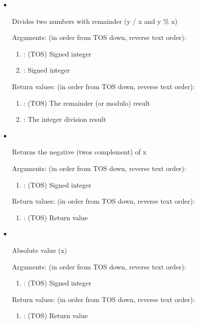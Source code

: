 \begin{itemize}
\noindent Return values: (in order from TOS down, reverse text order):
\begin{enumerate}
\item {}: (TOS) Lower 32 bits of the return product
\item {}: Upper 32 bits of the return product
\end{enumerate}

\item \forthinlinehl{/{\%}}\ 

\noindent Divides two numbers with remainder (y / x and y {\%} x)

\noindent Arguments: (in order from TOS down, reverse text order):
\begin{enumerate}
\item {}: (TOS) Signed integer
\item {}: Signed integer
\end{enumerate}

\noindent Return values: (in order from TOS down, reverse text order):
\begin{enumerate}
\item {}: (TOS) The remainder (or modulo) result
\item {}: The integer division result
\end{enumerate}

\item {}\ 

\noindent Returns the negative (twos complement) of x

\noindent Arguments: (in order from TOS down, reverse text order):
\begin{enumerate}
\item {}: (TOS) Signed integer
\end{enumerate}

\noindent Return values: (in order from TOS down, reverse text order):
\begin{enumerate}
\item {}: (TOS) Return value
\end{enumerate}

\item {}\ 

\noindent Absolute value ({\textbar}x{\textbar})

\noindent Arguments: (in order from TOS down, reverse text order):
\begin{enumerate}
\item {}: (TOS) Signed integer
\end{enumerate}

\noindent Return values: (in order from TOS down, reverse text order):
\begin{enumerate}
\item {}: (TOS) Return value
\end{enumerate}

\end{itemize}

